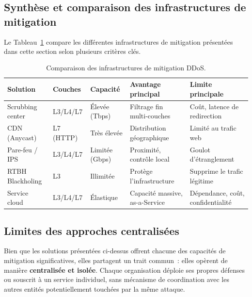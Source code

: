 \subsection{Synthèse et comparaison des infrastructures de mitigation}

Le Tableau~\ref{tab:comparaison_infra} compare les différentes infrastructures de mitigation présentées dans cette section selon plusieurs critères clés.

\begin{table}[H]
\centering
\caption{Comparaison des infrastructures de mitigation DDoS.}
\label{tab:comparaison_infra}
\small
\renewcommand{\arraystretch}{1.4}
\begin{tabularx}{\textwidth}{|l|X|X|X|X|}
\hline
\textbf{Solution} & \textbf{Couches} & \textbf{Capacité} & \textbf{Avantage principal} & \textbf{Limite principale} \\
\hline
Scrubbing center & L3/L4/L7 & Élevée (Tbps) & Filtrage fin multi-couches & Coût, latence de redirection \\
\hline
CDN (Anycast)    & L7 (HTTP) & Très élevée & Distribution géographique & Limité au trafic web \\
\hline
Pare-feu / IPS   & L3/L4/L7 & Limitée (Gbps) & Proximité, contrôle local & Goulot d'étranglement \\
\hline
RTBH Blackholing & L3 & Illimitée & Protège l'infrastructure & Supprime le trafic légitime \\
\hline
Service cloud    & L3/L4/L7 & Élastique & Capacité massive, as-a-Service & Dépendance, coût, confidentialité \\
\hline
\end{tabularx}
\end{table}

\subsection{Limites des approches centralisées}

Bien que les solutions présentées ci-dessus offrent chacune des capacités de mitigation significatives, elles partagent un trait commun~: elles opèrent de manière \textbf{centralisée et isolée}. Chaque organisation déploie ses propres défenses ou souscrit à un service individuel, sans mécanisme de coordination avec les autres entités potentiellement touchées par la même attaque.

